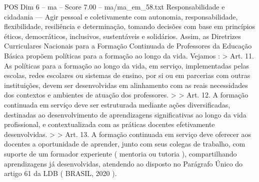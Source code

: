\begin{textsample}{POS Dim 6 – ma – Score 7.00 – ma/ma\_em\_58.txt}
Responsabilidade e cidadania — Agir pessoal e coletivamente com autonomia, responsabilidade, flexibilidade, resiliência e determinação, tomando decisões com base em princípios éticos, democráticos, inclusivos, sustentáveis e solidários.
Assim, as Diretrizes Curriculares Nacionais para a Formação Continuada de Professores da Educação Básica propõem políticas para a formação ao longo da vida.
Vejamos : > Art. 11.
As políticas para a formação ao longo da vida, em serviço, implementadas pelas escolas, redes escolares ou sistemas de ensino, por si ou em parcerias com outras instituições, devem ser desenvolvidas em alinhamento com as reais necessidades dos contextos e ambientes de atuação dos professores. > > Art. 12.
A formação continuada em serviço deve ser estruturada mediante ações diversificadas, destinadas ao desenvolvimento de aprendizagens significativas ao longo da vida profissional, e contextualizada com as práticas docentes efetivamente desenvolvidas. > > Art. 13.
A formação continuada em serviço deve oferecer aos docentes a oportunidade de aprender, junto com seus colegas de trabalho, com suporte de um formador experiente ( mentoria ou tutoria ), compartilhando aprendizagens já desenvolvidas, atendendo ao disposto no Parágrafo Único do artigo 61 da LDB ( BRASIL, 2020 ).

\end{textsample}
